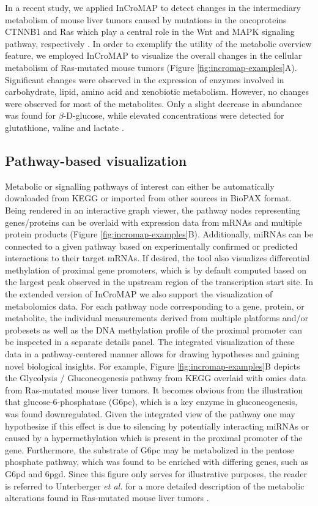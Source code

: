 \documentclass[final,5p,times,twocolumn]{elsarticle}
\newcommand\red[1]{{\color{red}#1}}
\begin{document}
\red{In a recent study, we applied InCroMAP to detect changes in the intermediary metabolism of mouse liver tumors caused by mutations in the oncoproteins CTNNB1 and Ras which play a central role in the Wnt and MAPK signaling pathway, respectively \cite{Unterberger2014}. In order to exemplify the utility of the metabolic overview feature, we employed InCroMAP to visualize the overall changes in the cellular metabolism of Ras-mutated mouse tumors (Figure \ref{fig:incromap-examples}A). Significant changes were observed in the expression of enzymes involved in carbohydrate, lipid, amino acid and xenobiotic metabolism. However, no changes were observed for most of the metabolites. Only a slight decrease in abundance was found for $\beta$-D-glucose, while elevated concentrations were detected for glutathione, valine and lactate \cite{Unterberger2014}.}

\subsection{Pathway-based visualization}
Metabolic or signalling pathways of interest can either be automatically downloaded from KEGG or imported from other sources in BioPAX format. Being rendered in an interactive graph viewer, the pathway nodes representing genes/proteins can be overlaid with expression data from mRNAs and multiple protein products (Figure \ref{fig:incromap-examples}B). Additionally, miRNAs can be connected to a given pathway based on experimentally confirmed or predicted interactions to their target mRNAs. If desired, the tool also visualizes differential methylation of proximal gene promoters, which is by default computed based on the largest peak observed in the upstream region of the transcription start site. In the extended version of InCroMAP we also support the visualization of metabolomics data. For each pathway node corresponding to a gene, protein, or metabolite, the individual measurements derived from multiple platforms and/or probesets as well as the DNA methylation profile of the proximal promoter can be inspected in a separate details panel. \red{The integrated visualization of these data in a pathway-centered manner allows for drawing hypotheses and gaining novel biological insights. For example, Figure \ref{fig:incromap-examples}B depicts the Glycolysis / Gluconeogenesis pathway from KEGG overlaid with omics data from Ras-mutated mouse liver tumors. It becomes obvious from the illustration that glucose-6-phosphatase (G6pc), which is a key enzyme in gluconeogenesis, was found downregulated. Given the integrated view of the pathway one may hypothesize if this effect is due to silencing by potentially interacting miRNAs or caused by a hypermethylation which is present in the proximal promoter of the gene. Furthermore, the substrate of G6pc may be metabolized in the pentose phosphate pathway, which was found to be enriched with differing genes, such as G6pd and 6pgd. Since this figure only serves for illustrative purposes, the reader is referred to Unterberger \textit{et al.} for a more detailed description of the metabolic alterations found in Ras-mutated mouse liver tumors \cite{Unterberger2014}.}
\end{document}
